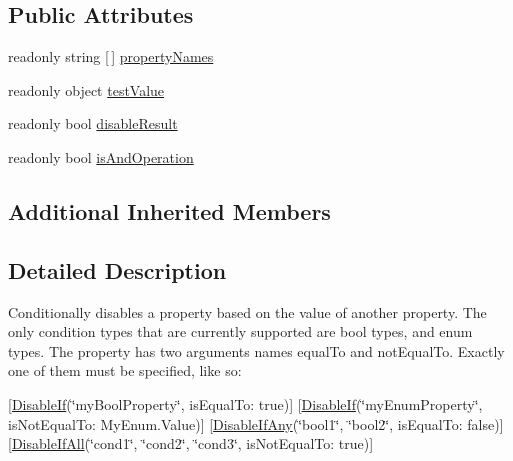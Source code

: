 \subsection*{Public Attributes}
\begin{DoxyCompactItemize}
\item 
readonly string \mbox{[}$\,$\mbox{]} \mbox{\hyperlink{class_leap_1_1_unity_1_1_attributes_1_1_disable_if_base_a5c529573cc3c68609da4337c7acf1cf2}{property\+Names}}
\item 
readonly object \mbox{\hyperlink{class_leap_1_1_unity_1_1_attributes_1_1_disable_if_base_aef08e07168b8f1ca42d005a1e4dac19c}{test\+Value}}
\item 
readonly bool \mbox{\hyperlink{class_leap_1_1_unity_1_1_attributes_1_1_disable_if_base_ae9879c16470936206d68800ce2dfa26a}{disable\+Result}}
\item 
readonly bool \mbox{\hyperlink{class_leap_1_1_unity_1_1_attributes_1_1_disable_if_base_a0b33d1b01859c98669e445ac4c0570fa}{is\+And\+Operation}}
\end{DoxyCompactItemize}
\subsection*{Additional Inherited Members}


\subsection{Detailed Description}
Conditionally disables a property based on the value of another property. The only condition types that are currently supported are bool types, and enum types. The property has two arguments names \textquotesingle{}equal\+To\textquotesingle{} and \textquotesingle{}not\+Equal\+To\textquotesingle{}. Exactly one of them must be specified, like so\+: 

\mbox{[}\mbox{\hyperlink{class_leap_1_1_unity_1_1_attributes_1_1_disable_if}{Disable\+If}}(\char`\"{}my\+Bool\+Property\char`\"{}, is\+Equal\+To\+: true)\mbox{]} \mbox{[}\mbox{\hyperlink{class_leap_1_1_unity_1_1_attributes_1_1_disable_if}{Disable\+If}}(\char`\"{}my\+Enum\+Property\char`\"{}, is\+Not\+Equal\+To\+: My\+Enum.\+Value)\mbox{]} \mbox{[}\mbox{\hyperlink{class_leap_1_1_unity_1_1_attributes_1_1_disable_if_any}{Disable\+If\+Any}}(\char`\"{}bool1\char`\"{}, \char`\"{}bool2\char`\"{}, is\+Equal\+To\+: false)\mbox{]} \mbox{[}\mbox{\hyperlink{class_leap_1_1_unity_1_1_attributes_1_1_disable_if_all}{Disable\+If\+All}}(\char`\"{}cond1\char`\"{}, \char`\"{}cond2\char`\"{}, \char`\"{}cond3\char`\"{}, is\+Not\+Equal\+To\+: true)\mbox{]} 

